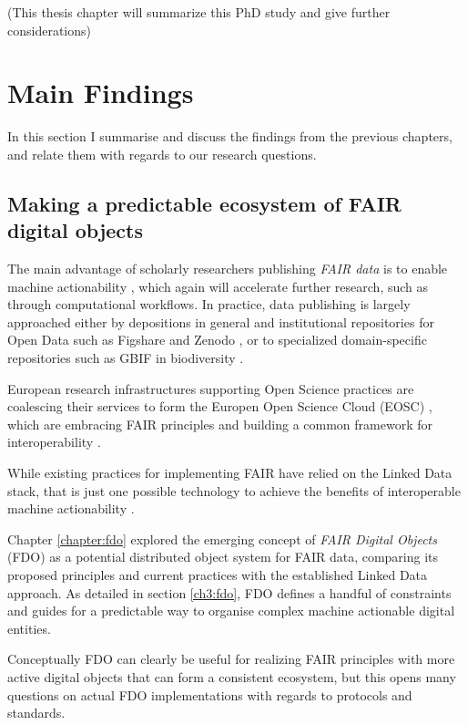 (This thesis chapter will summarize this PhD study and give further
considerations)

\section{Main Findings}

In this section I summarise and discuss the findings from the previous chapters, and relate them with regards to our research questions.


\subsection{Making a predictable ecosystem of FAIR digital objects}

The main advantage of scholarly researchers publishing \emph{FAIR data} is to enable machine actionability \cite{Wilkinson 2016}, which again will accelerate further research, such as through computational workflows. 
In practice, data publishing is largely approached either by depositions in general and institutional repositories for Open Data such as Figshare and Zenodo \cite{Dillen 2019}, or to specialized domain-specific repositories such as GBIF in biodiversity \cite{ch8-7}. 

European research infrastructures supporting Open Science practices are coalescing their services to form the Europen Open Science Cloud (EOSC) \cite{10.2777/940154}, which are embracing FAIR principles \cite{Mons 2017} and building a common framework for interoperability \cite{eosc-interop-framework}. 

While existing practices for implementing FAIR have relied on the Linked Data stack, that is just one possible technology to achieve the benefits of interoperable machine actionability \cite{Mons 2017}. 

Chapter \ref{chapter:fdo} explored the emerging concept of \emph{FAIR Digital Objects} (FDO) \cite{Schultes 2019} as a potential distributed object system for FAIR data, comparing its proposed principles and current practices with the established Linked Data approach. 
As detailed in section \vref{ch3:fdo}, FDO defines a handful of constraints and guides for a predictable way to organise complex machine actionable digital entities. 

Conceptually FDO can clearly be useful for realizing FAIR principles with more active digital objects that can form a consistent ecosystem, but this opens many questions on actual FDO implementations with regards to protocols and standards.

